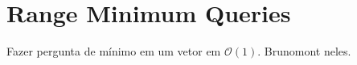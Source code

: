 \section{Range Minimum Queries}

Fazer pergunta de mínimo em um vetor em $\mathcal{O}(1)$. Brunomont neles.

